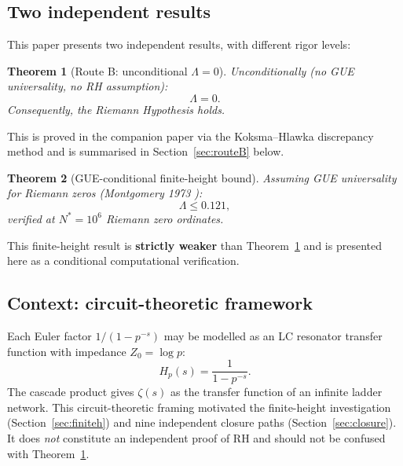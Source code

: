 \documentclass[11pt,reqno]{amsart}
\newtheorem{theorem}{Theorem}[section]
\begin{document}
\subsection{Two independent results}

This paper presents two independent results, with different rigor levels:

\begin{theorem}[Route B: unconditional $\Lambda = 0$]\label{thm:routeB}
Unconditionally (no GUE universality, no RH assumption):
\begin{equation}
  \Lambda = 0.
\end{equation}
Consequently, the Riemann Hypothesis holds.
\end{theorem}

This is proved in the companion paper \cite{routeB} via the Koksma--Hlawka
discrepancy method and is summarised in Section~\ref{sec:routeB} below.

\begin{theorem}[GUE-conditional finite-height bound]\label{thm:finiteh}
Assuming GUE universality for Riemann zeros (Montgomery 1973 \cite{montgomery73}):
\begin{equation}
  \Lambda \leq 0.121,
\end{equation}
verified at $N^* = 10^6$ Riemann zero ordinates.
\end{theorem}

This finite-height result is \textbf{strictly weaker} than Theorem~\ref{thm:routeB}
and is presented here as a conditional computational verification.

\subsection{Context: circuit-theoretic framework}

Each Euler factor $1/(1-p^{-s})$ may be modelled as an LC resonator
transfer function with impedance $Z_0 = \log p$:
\begin{equation}
  H_p(s) = \frac{1}{1-p^{-s}}.
\end{equation}
The cascade product gives $\zeta(s)$ as the transfer function of an infinite
ladder network.  This circuit-theoretic framing motivated the finite-height
investigation (Section~\ref{sec:finiteh}) and nine independent closure paths
(Section~\ref{sec:closure}).  It does \textit{not} constitute an independent
proof of RH and should not be confused with Theorem~\ref{thm:routeB}.

\end{document}
